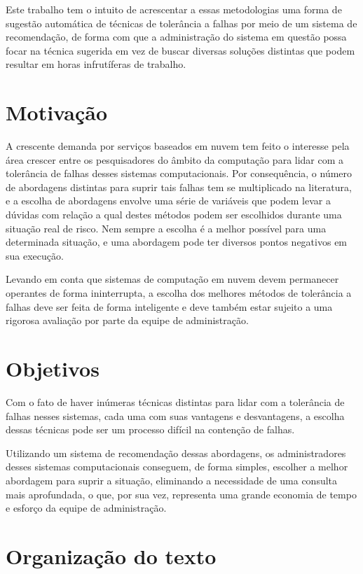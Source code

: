 \documentclass[
	12pt,				%
	a4paper,			%
	english,			%
	french,				%
	spanish,			%
	brazil				%
	]{abntex2}
\begin{document}
Este trabalho tem o intuito de acrescentar a essas metodologias uma forma de sugestão automática de técnicas de tolerância a falhas por meio de um sistema de recomendação, de forma com que a administração do sistema em questão possa focar na técnica sugerida em vez de buscar diversas soluções distintas que podem resultar em horas infrutíferas de trabalho.

\section{Motivação}

A crescente demanda por serviços baseados em nuvem tem feito o interesse pela área crescer entre os pesquisadores do âmbito da computação para lidar com a tolerância de falhas desses sistemas computacionais. Por consequência, o número de abordagens distintas para suprir tais falhas tem se multiplicado na literatura, e a escolha de abordagens envolve uma série de variáveis que podem levar a dúvidas com relação a qual destes métodos podem ser escolhidos durante uma situação real de risco. Nem sempre a escolha é a melhor possível para uma determinada situação, e uma abordagem pode ter diversos pontos negativos em sua execução.

Levando em conta que sistemas de computação em nuvem devem permanecer operantes de forma ininterrupta, a escolha dos melhores métodos de tolerância a falhas deve ser feita de forma inteligente e deve também estar sujeito a uma rigorosa avaliação por parte da equipe de administração.

\section{Objetivos}

Com o fato de haver inúmeras técnicas distintas para lidar com a tolerância de falhas nesses sistemas, cada uma com suas vantagens e desvantagens, a escolha dessas técnicas pode ser um processo difícil na contenção de falhas.

Utilizando um sistema de recomendação dessas abordagens, os administradores desses sistemas computacionais conseguem, de forma simples, escolher a melhor abordagem para suprir a situação, eliminando a necessidade de uma consulta mais aprofundada, o que, por sua vez, representa uma grande economia de tempo e esforço da equipe de administração.

\section{Organização do texto}
\end{document}
